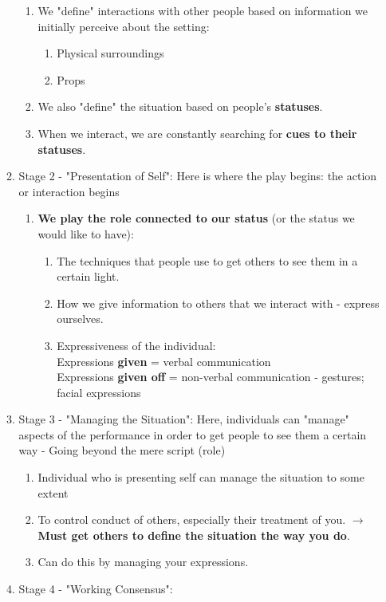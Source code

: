 \documentclass[12pt,a4paper]{article}
\begin{document}
\begin{enumerate}
\begin{enumerate}
\begin{enumerate}
			\item We "define" interactions with other people based on information we initially perceive about the setting: 
			\begin{enumerate}
				\item Physical surroundings
				\item Props
			\end{enumerate}
			\item We also "define" the situation based on people's \textbf{statuses}.
			\item When we interact, we are constantly searching for \textbf{cues to their statuses}. 
		\end{enumerate}
		\item Stage 2 - "Presentation of Self": Here is where the play begins: the action or interaction begins
		\begin{enumerate}
			\item \textbf{We play the role connected to our status} (or the status we would like to have):
			\begin{enumerate}
				\item The techniques that people use to get others to see them in a certain light. 
				\item How we give information to others that we interact with - express ourselves.
				\item Expressiveness of the individual: \\
					Expressions \textbf{given} = verbal communication\\
					Expressions \textbf{given off} = non-verbal communication - gestures; facial expressions
			\end{enumerate}
		\end{enumerate}
		\item Stage 3 - "Managing the Situation": Here, individuals can "manage" aspects of the performance in order to get people to see them a certain way - Going beyond the mere script (role)
		\begin{enumerate}
			\item Individual who is presenting self can manage the situation to some extent
			\item To control conduct of others, especially their treatment of you. $\rightarrow$ \textbf{Must get others to define the situation the way you do}. 
			\item Can do this by managing your expressions.
		\end{enumerate}
		\item Stage 4 - "Working Consensus": 

\end{enumerate}
\end{enumerate}
\end{document}
